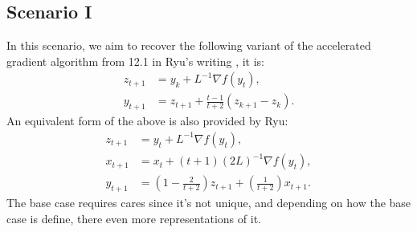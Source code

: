 \documentclass[12pt]{article}
\begin{document}
    \subsection{Scenario I}
        In this scenario, we aim to recover the following variant of the accelerated gradient algorithm from 12.1 in Ryu's writing \cite{ryu_large-scale_2022}, it is: 
        \begin{align*}
            z_{t + 1} &= y_k + L^{-1}\nabla f(y_t), 
            \\
            y_{t + 1} &= z_{t + 1} + \frac{t - 1}{t + 2}\left(
                z_{k + 1} - z_k
            \right). 
        \end{align*}
        An equivalent form of the above is also provided by Ryu: 
        \begin{align*}
            z_{t + 1} &= y_t + L^{-1}\nabla f(y_t), 
            \\
            x_{t + 1} &= x_t + (t + 1)(2L)^{-1}\nabla f(y_t), 
            \\
            y_{t + 1} &= \left(
                1 - \frac{2}{t + 2} 
            \right)z_{t + 1} + 
            \left(
                \frac{1}{t + 2}
            \right)x_{t + 1}. 
        \end{align*}
        The base case requires cares since it's not unique, and depending on how the base case is define, there even more representations of it. 
\end{document}
